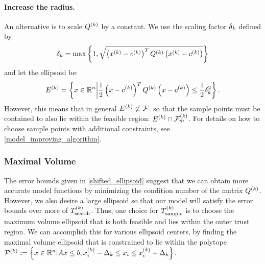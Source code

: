 \paragraph*{Increase the radius.}
An alternative is to scale ${Q^{(k)}}$ by a constant.
We use the scaling factor $\delta_k$ defined by
\begin{align*}
\delta_k = \max \left\{1, \sqrt{\left(x^{(k)} - c^{(k)} \right)^T {Q^{(k)}} \left(x^{(k)} - c^{(k)} \right)} \right\}
\end{align*}
and let the ellipsoid be:
\begin{align*}
{E^{(k)}} = \left\{x \in \mathbb R^n \bigg| \frac 1 2 \left(x - c^{(k)}\right)^T {Q^{(k)}} \left(x - c^{(k)}\right) \le \frac 1 2 \delta_k^2\right\}.
\end{align*}
However, this means that in general ${E^{(k)}} \not \subset {\mathcal F}$.
so that the sample points must be contained to also lie within the feasible region: ${E^{(k)}} \cap {\mathcal F_m^{(k)}}$.
For details on how to choose sample points with additional constraints, see \cref{model_improving_algorithm}.




\subsubsection{Maximal Volume}
\label{ellipse_optimization}
The error bounds given in \cref{shifted_ellipsoid} suggest that we can obtain more accurate model functions by 
minimizing the condition number of the matrix ${Q^{(k)}}$.
However, we also desire a large ellipsoid so that our model will satisfy the error bounds over more of ${T_{\text{search}}^{(k)}}$.
Thus, one choice for ${T_{\text{sample}}^{(k)}}$ is to choose the maximum volume ellipsoid that is both feasible and lies within the outer trust region.
We can accomplish this for various ellipsoid centers, by finding the maximal volume ellipsoid that is constrained to lie within the polytope
${{\mathcal{P}}^{(k)}} := \left\{x \in \mathbb R^n | {A} x\le {b},   x_i^{(k)} - \Delta_k \le x_i \le x_i^{(k)} + \Delta_k\right\}.$

